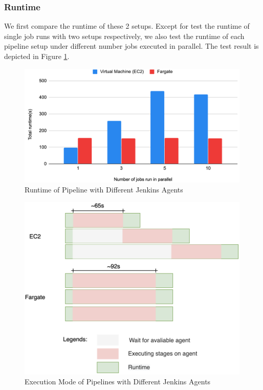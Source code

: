 \subsubsection{Runtime}
We first compare the runtime of these 2 setups. Except for test the runtime of single job runs with two setups respectively, we also test the runtime of each pipeline setup under different number jobs executed in parallel. The test result is depicted in Figure \ref{fig:runtime}.
\begin{figure}[h]
\centering
\includegraphics[width=0.99\textwidth]{pics/runtime.png}
\caption{Runtime of Pipeline with Different Jenkins Agents}
\label{fig:runtime}
\end{figure}
\begin{figure}[h]
\centering
\includegraphics[width=0.99\textwidth]{pics/parallel.png}
\caption{Execution Mode of Pipelines with Different Jenkins Agents}
\label{fig:parallel}
\end{figure}
